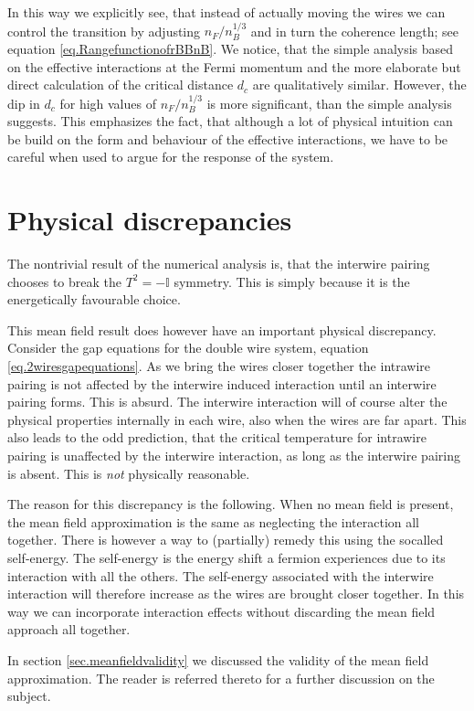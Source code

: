 In this way we explicitly see, that instead of actually moving the wires we can control the transition by adjusting $n_F/n_B^{1/3}$ and in turn the coherence length; see equation \eqref{eq.RangefunctionofrBBnB}. We notice, that the simple analysis based on the effective interactions at the Fermi momentum and the more elaborate but direct calculation of the critical distance $d_c$ are qualitatively similar. However, the dip in $d_c$ for high values of $n_F/n_B^{1/3}$ is more significant, than the simple analysis suggests. This emphasizes the fact, that although a lot of physical intuition can be build on the form and behaviour of the effective interactions, we have to be careful when used to argue for the response of the system.

\section{Physical discrepancies} \label{sec.physicaldiscrepancies}
The nontrivial result of the numerical analysis is, that the interwire pairing chooses to break the $T^2 = -\mathbb{I}$ symmetry. This is simply because it is the energetically favourable choice. 

This mean field result does however have an important physical discrepancy. Consider the gap equations for the double wire system, equation \eqref{eq.2wiresgapequations}. As we bring the wires closer together the intrawire pairing is not affected by the interwire induced interaction until an interwire pairing forms. This is absurd. The interwire interaction will of course alter the physical properties internally in each wire, also when the wires are far apart. This also leads to the odd prediction, that the critical temperature for intrawire pairing is unaffected by the interwire interaction, as long as the interwire pairing is absent. This is \textit{not} physically reasonable. 

The reason for this discrepancy is the following. When no mean field is present, the mean field approximation is the same as neglecting the interaction all together. There is however a way to (partially) remedy this using the socalled self-energy. The self-energy is the energy shift a fermion experiences due to its interaction with all the others. The self-energy associated with the interwire interaction will therefore increase as the wires are brought closer together. In this way we can incorporate interaction effects without discarding the mean field approach all together. 

In section \ref{sec.meanfieldvalidity} we discussed the validity of the mean field approximation. The reader is referred thereto for a further discussion on the subject. 


